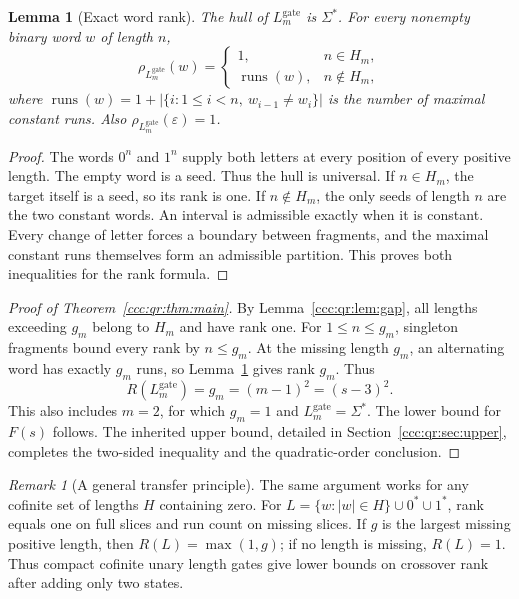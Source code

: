 \documentclass[11pt,letterpaper]{article}
\newtheorem{lemma}[theorem]{Lemma}
\theoremstyle{definition}
\theoremstyle{remark}
\newtheorem{remark}[theorem]{Remark}
\newcommand{\eps}{\varepsilon}
\newcommand{\rank}{\rho}
\newcommand{\runs}{\operatorname{runs}}
\newcommand{\Lgate}[1]{L^{\mathrm{gate}}_{#1}}
\begin{document}
\begin{lemma}[Exact word rank]\label{ccc:qr:lem:rank}
The hull of $\Lgate m$ is $\Sigma^*$. For every nonempty binary word $w$ of
length $n$,
\[
\rank_{\Lgate m}(w)=
\begin{cases}
1,&n\in H_m,\\
\runs(w),&n\notin H_m,
\end{cases}
\]
where $\runs(w)=1+|\{i:1\le i<n,\ w_{i-1}\ne w_i\}|$ is the number of
maximal constant runs. Also $\rank_{\Lgate m}(\eps)=1$.
\end{lemma}
\begin{proof}
The words $0^n$ and $1^n$ supply both letters at every position of every
positive length. The empty word is a seed. Thus the hull is universal. If
$n\in H_m$, the target itself is a seed, so its rank is one. If
$n\notin H_m$, the only seeds of length $n$ are the two constant words. An
interval is admissible exactly when it is constant. Every change of letter
forces a boundary between fragments, and the maximal constant runs
themselves form an admissible partition. This proves both inequalities for
the rank formula.
\end{proof}

\begin{proof}[Proof of Theorem~\ref{ccc:qr:thm:main}]
By Lemma~\ref{ccc:qr:lem:gap}, all lengths exceeding $g_m$ belong to $H_m$
and have rank one. For $1\le n\le g_m$, singleton fragments bound every rank
by $n\le g_m$. At the missing length $g_m$, an alternating word has exactly
$g_m$ runs, so Lemma~\ref{ccc:qr:lem:rank} gives rank $g_m$. Thus
\[
R(\Lgate m)=g_m=(m-1)^2=(s-3)^2.
\]
This also includes $m=2$, for which $g_m=1$ and $\Lgate m=\Sigma^*$. The
lower bound for $F(s)$ follows. The inherited upper bound, detailed in
Section~\ref{ccc:qr:sec:upper}, completes the two-sided inequality and the
quadratic-order conclusion.
\end{proof}

\begin{remark}[A general transfer principle]\label{ccc:qr:rem:transfer}
The same argument works for any cofinite set of lengths $H$ containing zero.
For $L=\{w:|w|\in H\}\cup0^*\cup1^*$, rank equals one on full slices and run
count on missing slices. If $g$ is the largest missing positive length, then
$R(L)=\max(1,g)$; if no length is missing, $R(L)=1$. Thus compact cofinite
unary length gates give lower bounds on crossover rank after adding only two
states.
\end{remark}
\end{document}
